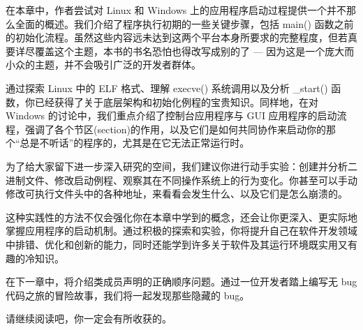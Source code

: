 在本章中，作者尝试对 Linux 和 Windows 上的应用程序启动过程提供一个并不那么全面的概述。我们介绍了程序执行初期的一些关键步骤，包括 main() 函数之前的初始化流程。虽然这些内容远未达到这两个平台本身所要求的完整程度，但若真要详尽覆盖这个主题，本书的书名恐怕也得改写成别的了 --- 因为这是一个庞大而小众的主题，并不会吸引广泛的开发者群体。

通过探索 Linux 中的 ELF 格式、理解 execve() 系统调用以及分析 \_start() 函数，你已经获得了关于底层架构和初始化例程的宝贵知识。同样地，在对 Windows 的讨论中，我们重点介绍了控制台应用程序与 GUI 应用程序的启动流程，强调了各个节区(section)的作用，以及它们是如何共同协作来启动你的那个“总是不听话”的程序的，尤其是在它无法正常运行时。

为了给大家留下进一步深入研究的空间，我们建议你进行动手实验：创建并分析二进制文件、修改启动例程、观察其在不同操作系统上的行为变化。你甚至可以手动修改可执行文件头中的各种地址，来看看会发生什么、以及它们是怎么崩溃的。

这种实践性的方法不仅会强化你在本章中学到的概念，还会让你更深入、更实际地掌握应用程序的启动机制。通过积极的探索和实验，你将提升自己在软件开发领域中排错、优化和创新的能力，同时还能学到许多关于软件及其运行环境既实用又有趣的冷知识。

在下一章中，将介绍类成员声明的正确顺序问题。通过一位开发者踏上编写无 bug 代码之旅的冒险故事，我们将一起发现那些隐藏的 bug。

请继续阅读吧，你一定会有所收获的。